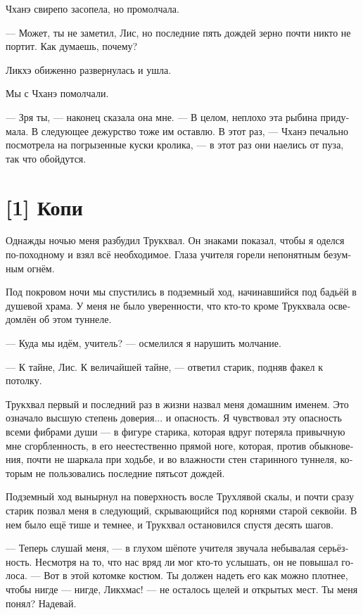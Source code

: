 \documentclass[a4paper,12pt,fleqn]{book}\usepackage{cooltooltips}\usepackage{polyglossia}\setdefaultlanguage[babelshorthands=true]{russian}\setotherlanguage{english}\defaultfontfeatures{Ligatures=TeX,Mapping=tex-text} \usepackage{xcolor}\definecolor{lightgray}{HTML}{bbbbbb}\color{lightgray}\newcommand{\ml}[3]{\textenglish{\textcolor{black}{#3}}}
\begin{document}
{Чханэ свирепо засопела, но промолчала.

--- Может, ты не заметил, Лис, но последние пять дождей зерно почти никто не портит.
Как думаешь, почему?

Ликхэ обиженно развернулась и ушла.

Мы с Чханэ помолчали.

--- Зря ты, --- наконец сказала она мне.
--- В целом, неплохо эта рыбина придумала.
В следующее дежурство тоже им оставлю.
В этот раз, --- Чханэ печально посмотрела на погрызенные куски кролика, --- в этот раз они наелись от пуза, так что обойдутся.

\section{[1] Копи}

Однажды ночью меня разбудил Трукхвал.
Он знаками показал, чтобы я оделся по-походному и взял всё необходимое.
Глаза учителя горели непонятным безумным огнём.

Под покровом ночи мы спустились в подземный ход, начинавшийся под бадьёй в душевой храма.
У меня не было уверенности, что кто-то кроме Трукхвала осведомлён об этом туннеле.

--- Куда мы идём, учитель? --- осмелился я нарушить молчание.

--- К тайне, Лис.
К величайшей тайне, --- ответил старик, подняв факел к потолку.

Трукхвал первый и последний раз в жизни назвал меня домашним именем.
Это означало высшую степень доверия... и опасность.
Я чувствовал эту опасность всеми фибрами души --- в фигуре старика, которая вдруг потеряла привычную мне сгорбленность, в его неестественно прямой ноге, которая, против обыкновения, почти не шаркала при ходьбе, и во влажности стен старинного туннеля, которым не пользовались последние пятьсот дождей.

Подземный ход вынырнул на поверхность восле Трухлявой скалы, и почти сразу старик позвал меня в следующий, скрывающийся под корнями старой секвойи.
В нем было ещё тише и темнее, и Трукхвал остановился спустя десять шагов.

--- Теперь слушай меня, --- в глухом шёпоте учителя звучала небывалая серьёзность.
Несмотря на то, что нас вряд ли мог кто-то услышать, он не повышал голоса.
--- Вот в этой котомке костюм.
Ты должен надеть его как можно плотнее, чтобы нигде --- нигде, Ликхмас! --- не осталось щелей и открытых мест.
Ты меня понял?
Надевай.

}
\end{document}
